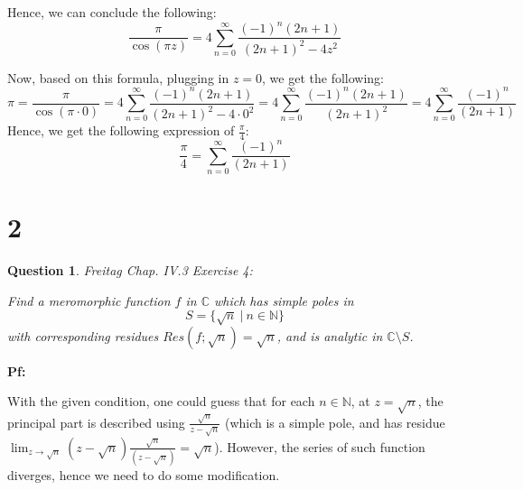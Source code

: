 \documentclass{article}
\newtheorem{question}{Question}
\begin{document}
Hence, we can conclude the following:
$$\frac{\pi}{\cos(\pi z)}=4\sum_{n=0}^{\infty}\frac{(-1)^n(2n+1)}{(2n+1)^2-4z^2}$$

\hfil

Now, based on this formula, plugging in $z=0$, we get the following:
$$\pi =\frac{\pi}{\cos(\pi \cdot 0)}=4\sum_{n=0}^{\infty}\frac{(-1)^n(2n+1)}{(2n+1)^2-4\cdot 0^2} = 4\sum_{n=0}^{\infty}\frac{(-1)^n(2n+1)}{(2n+1)^2}=4\sum_{n=0}^{\infty}\frac{(-1)^n}{(2n+1)}$$
Hence, we get the following expression of $\frac{\pi}{4}$:
$$\frac{\pi}{4}=\sum_{n=0}^{\infty}\frac{(-1)^n}{(2n+1)}$$

\break

\section*{2}
\begin{myBox}[]{}
    \begin{question}
        Freitag Chap. IV.3 Exercise 4:

        Find a meromorphic function $f$ in $\mathbb{C}$ which has simple poles in 
        $$S=\{\sqrt{n}\ |\ n\in\mathbb{N}\}$$
        with corresponding residues $Res(f;\sqrt{n})=\sqrt{n}$, and is analytic in $\mathbb{C}\setminus S$.
    \end{question}
\end{myBox}

\textbf{Pf:}

With the given condition, one could guess that for each $n\in\mathbb{N}$, at $z=\sqrt{n}$, the principal part is described using $\frac{\sqrt{n}}{z-\sqrt{n}}$ (which is a simple pole, and has residue $\lim_{z\rightarrow\sqrt{n}}(z-\sqrt{n})\frac{\sqrt{n}}{(z-\sqrt{n})}=\sqrt{n}$). 
However, the series of such function diverges, hence we need to do some modification.

\hfil
\end{document}
